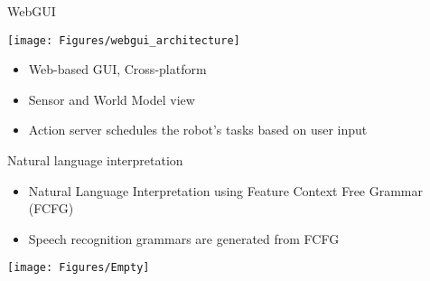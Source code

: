 \documentclass[12pt,a4paper]{article}
\newcommand{\emptylogo}{\texttt{[image: Figures/Empty]}}
\begin{document}
\begin{slidetop}
\begin{multicols}{2}
\begin{bclogo}[couleur = white, arrondi = 0.25, couleurBord = tuedarkblue , barre = none, logo=\emptylogo]{\textcolor{tuedarkblue}{WebGUI}}
\medskip %
\begin{minipage}[T]{\textwidth}
    \begin{center}
        \texttt{[image: Figures/webgui\_architecture]}
    \end{center}
\end{minipage}
\begin{itemize}[itemsep = 0pt, parsep = 0pt, leftmargin=15pt]
	\item Web-based GUI, Cross-platform
	\item Sensor and World Model view
	\item Action server schedules the robot's tasks based on user input
\end{itemize}
\end{bclogo}

\vspace{-0.83cm} %

\begin{bclogo}[couleur = white, arrondi = 0.25, couleurBord = tuedarkblue, barre = none, logo=\emptylogo]{\textcolor{tuedarkblue}{Natural language interpretation}}
\medskip %
\begin{itemize}[itemsep = 0pt, parsep = 0pt, leftmargin=15pt]
	\item Natural Language Interpretation using Feature Context Free Grammar (FCFG)
	\item Speech recognition grammars are generated from FCFG
\end{itemize}
\end{bclogo}

\texttt{[image: Figures/Empty]}
\end{multicols}
\end{slidetop}
\end{document}
